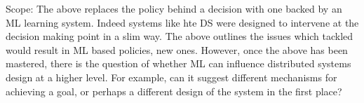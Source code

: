\documentclass[a4paper,twocolumn]{article}
\begin{document}
Scope:
The above replaces the policy behind a decision with one backed by an ML learning system.
Indeed systems like hte DS were designed to intervene at the decision making point in a
slim way. The above outlines the issues which tackled would result in ML based policies,
new ones. However, once the above has been mastered, there is the question of whether ML
can influence distributed systems design at a higher level. For example, can it suggest
different mechanisms for achieving a goal, or perhaps a different design of the system in the first place?
\end{document}
